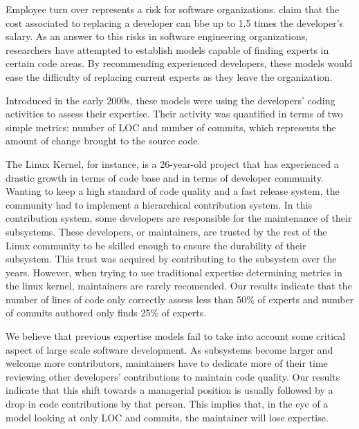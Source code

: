 \label{sec:Introduction}  


Employee turn over represents a risk for software organizations. \citep{turnover} claim that the cost associated to replacing a developer can bbe up to 1.5 times the developer's salary. As an answer to this risks in software engineering organizations, researchers have attempted to establish models capable of finding experts in certain code areas. By recommending experienced developers, these models would ease the difficulty of replacing current experts as they leave the organization. 


Introduced in the early 2000s, these models were using the developers' coding activities to assess their expertise. Their activity was quantified in terms of two simple metrics: number of \ac{LOC} and number of commits, which represents the amount of change brought to the source code. 

The Linux Kernel, for instance, is a 26-year-old project that has experienced a drastic growth in terms of code base and in terms of developer community. Wanting to keep a high standard of code quality and a fast release system, the community had to implement a hierarchical contribution system. In this contribution system, some developers are responsible for the maintenance of their subsystems. These developers, or maintainers, are trusted by the rest of the Linux community to be skilled enough to ensure the durability of their subsystem. This trust was acquired by contributing to the subsystem over the years. However, when trying to use traditional expertise determining metrics in the linux kernel, maintainers are rarely recomended. Our results indicate that the number of lines of code only correctly assess less than 50\% of experts and number of commits authored only finds 25\% of experts. 


We believe that previous expertise models fail to take into account some critical aspect of large scale software development. As subsystems become larger and welcome more contributors, maintainers have to dedicate more of their time reviewing other developers' contributions to maintain code quality. Our results indicate that this shift towards a managerial position is usually followed by a drop in code contributions by that person. This implies that, in the eye of a model looking at only \ac{LOC} and commits, the maintainer will lose expertise. 


